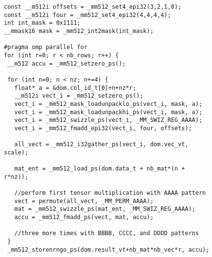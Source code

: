 \documentclass{article}
\begin{document}
\thispagestyle{empty}

\begin{figure}[h]
\begin{center}
\begin{verbatim}
const __m512i offsets = _mm512_set4_epi32(3,2,1,0);
const __m512i four = _mm512_set4_epi32(4,4,4,4); 
int int_mask = 0x1111;
__mmask16 mask = _mm512_int2mask(int_mask);

#pragma omp parallel for
for (int r=0; r < nb_rows; r++) {
 __m512 accu = _mm512_setzero_ps();

 for (int n=0; n < nz; n+=4) {
   float* a = &dom.col_id_t[0]+n+nz*r;
   __m512i vect_i = _mm512_setzero_ps();
   vect_i = _mm512_mask_loadunpacklo_ps(vect_i, mask, a);
   vect_i = _mm512_mask_loadunpackhi_ps(vect_i, mask, a);
   vect_i = _mm512_swizzle_ps(vect_i, _MM_SWIZ_REG_AAAA);
   vect_i = _mm512_fmadd_epi32(vect_i, four, offsets);

   all_vect = _mm512_i32gather_ps(vect_i, dom.vec_vt, scale);

   mat_ent = _mm512_load_ps(dom.data_t + nb_mat*(n + r*nz));

   //perform first tensor multiplication with AAAA pattern
   vect = permute(all_vect, _MM_PERM_AAAA);
   mat = _mm512_swizzle_ps(mat_ent, _MM_SWIZ_REG_AAAA);
   accu = _mm512_fmadd_ps(vect, mat, accu);

   //three more times with BBBB, CCCC, and DDDD patterns
 }
 _mm512_storenrngo_ps(dom.result_vt+nb_mat*nb_vec*r, accu);  
\end{verbatim}
\end{center}
\end{figure}
\end{document}
